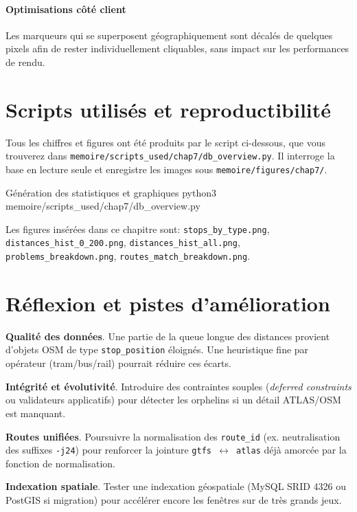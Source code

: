 \paragraph{Optimisations côté client} Les marqueurs qui se superposent géographiquement sont \og décalés \fg{} de quelques pixels afin de rester individuellement cliquables, sans impact sur les performances de rendu.

\section{Scripts utilisés et reproductibilité}
\label{subsec:scripts-ch7}
Tous les chiffres et figures ont été produits par le script ci-dessous, que vous trouverez dans \texttt{memoire/scripts\_used/chap7/db\_overview.py}. Il interroge la base en lecture seule et enregistre les images sous \texttt{memoire/figures/chap7/}.

\begin{codebox}[language=bash]{Génération des statistiques et graphiques}
python3 memoire/scripts_used/chap7/db_overview.py
\end{codebox}

\noindent
Les figures insérées dans ce chapitre sont: 
\texttt{stops\_by\_type.png}, \texttt{distances\_hist\_0\_200.png}, \texttt{distances\_hist\_all.png}, \texttt{problems\_breakdown.png}, \texttt{routes\_match\_breakdown.png}.

\section{Réflexion et pistes d'amélioration}
\textbf{Qualité des données}. Une partie de la queue longue des distances provient d'objets OSM de type \texttt{stop\_position} éloignés. Une heuristique fine par opérateur (tram/bus/rail) pourrait réduire ces écarts.

\textbf{Intégrité et évolutivité}. Introduire des contraintes souples (\textit{deferred constraints} ou validateurs applicatifs) pour détecter les \og orphelins \fg{} si un détail ATLAS/OSM est manquant.

\textbf{Routes unifiées}. Poursuivre la normalisation des \texttt{route\_id} (ex. neutralisation des suffixes \texttt{-j24}) pour renforcer la jointure \texttt{gtfs $\leftrightarrow$ atlas} déjà amorcée par la fonction de normalisation.

\textbf{Indexation spatiale}. Tester une indexation géospatiale (MySQL SRID 4326 ou PostGIS si migration) pour accélérer encore les fenêtres sur de très grands jeux.

